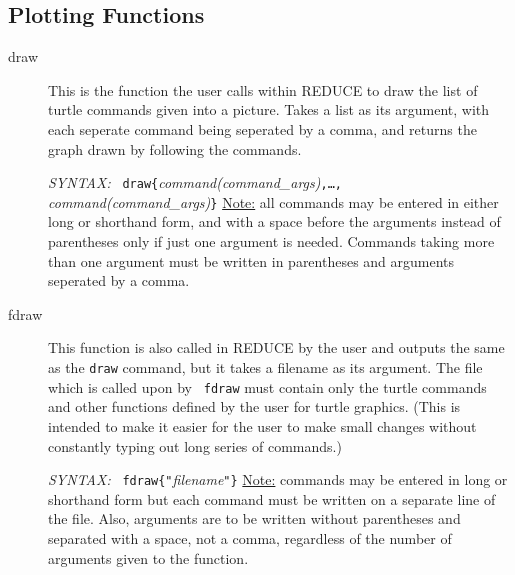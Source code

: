 \documentclass[11pt]{article}
\newcommand{\syntax}{\textsl{SYNTAX: }}
\begin{document}
\subsection{Plotting Functions}
\begin{description}
 \item[draw] This is the function the user calls within {\small REDUCE} to
       draw the list of turtle commands given into a picture. Takes a list
       as its argument, with each seperate command being seperated by a
       comma, and returns the graph drawn by following the commands.

       \syntax\ {\tt draw\{}{\it command(command\_args)}{\tt ,\ldots,}      
                              {\it command(command\_args)}{\tt \}}
       \underline{Note:} all commands may be entered in either long or
                         shorthand form, and with a space
                         before the arguments instead of parentheses only
                         if just one argument is needed. Commands taking
                         more than one argument must be written in
                         parentheses and arguments seperated by a comma.
 \item[fdraw] This function is also called in {\small REDUCE} by the user 
       and outputs the same as the {\tt draw} command, but it takes a
       filename as its argument. The file which is called upon by {\tt
       fdraw} must contain only the turtle commands and other functions
       defined by the user for turtle graphics. (This is intended to make
       it easier for the user to make small changes without constantly
       typing out long series of commands.)

       \syntax\ {\tt fdraw\{"}{\it filename}{\tt "\}}
       \underline{Note:} commands may be entered in long or shorthand form
                         but each command must be written on a separate
                         line of the file. Also, arguments are to be
                         written without parentheses and separated with a
                         space, not a comma, regardless of the number of
                         arguments given to the function.
\end{description}
\end{document}
